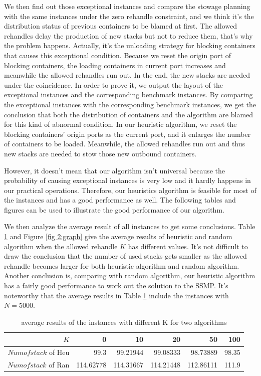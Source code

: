 \documentclass[review,3p,times,authoryear,12pt]{elsarticle}
\begin{document}
We then find out those exceptional instances and compare the stowage planning with the same instances under the zero rehandle constraint, and we think it's the distribution status of previous containers to be blamed at first.
The allowed rehandles delay the production of new stacks but not to reduce them, that's why the problem happens.
Actually, it's the unloading strategy for blocking containers that causes this exceptional condition.
Because we reset the origin port of blocking containers, the loading containers in current port increases and meanwhile the allowed rehandles run out.
In the end, the new stacks are needed under the coincidence.
In order to prove it, we output the layout of the exceptional instances and the corresponding benchmark instances.
By comparing the exceptional instances with the corresponding benchmark instances, we get the conclusion that both the distribution of containers and the algorithm are blamed for this kind of abnormal condition.
In our heuristic algorithm, we reset the blocking containers' origin ports as the current port, and it enlarges the number of containers to be loaded.
Meanwhile, the allowed rehandles run out and thus new stacks are needed to stow those new outbound containers.

However, it doesn't mean that our algorithm isn't universal because the probability of causing exceptional instances is very low and it hardly happens in our practical operations.
Therefore, our heuristics algorithm is feasible for most of the instances and has a good performance as well.
The following tables and figures can be used to illustrate the good performance of our algorithm.

We then analyze the average result of all instances to get some conclusions.
Table \ref{tab:4} and Figure \ref{fig 2:graph} give the average results of heuristic and random algorithm when the allowed rehandle $K$ has different values.
It's not difficult to draw the conclusion that the number of used stacks gets smaller as the allowed rehandle becomes larger for both heuristic algorithm and random algorithm.
Another conclusion is, comparing with random algorithm, our heuristic algorithm has a fairly good performance to work out the solution to the SSMP.
It's noteworthy that the average results in Table \ref{tab:4} include the instances with $N=5000$.

\begin{table}[!htbp]
  \centering
  \setlength{\belowcaptionskip}{10pt}
  \caption{average results of the instances with different K for two algorithms}
    \begin{tabular}{r|r|r|r|r|r}
    \hline
     $K$       &0   &10  &20  &50  &100\\
    \hline
    $Numofstack$ of Heu   &99.3  &99.21944  &99.08333   &98.73889  &98.35\\
 \hline
    $Numofstack$ of Ran  &114.62778  &114.31667  &114.21448  &112.86111 &111.9\\
 \hline
    \end{tabular}
  \label{tab:4}
\end{table}
\end{document}
